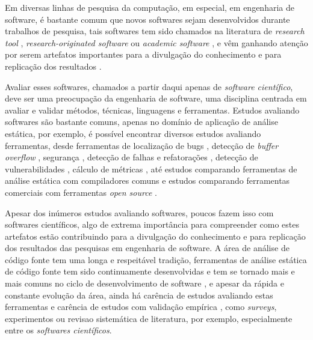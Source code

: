 
Em diversas linhas de pesquisa da computação, em especial, em engenharia de
software, é bastante comum que novos softwares sejam desenvolvidos durante
trabalhos de pesquisa, tais softwares tem sido chamados na literatura de {\it
research tool} \cite{Portillo12}, {\it research-originated software}
\cite{Kon2011} ou {\it academic software}
\cite{allen2017engineering}, e vêm ganhando atenção por serem artefatos importantes para a
divulgação do conhecimento e para replicação dos resultados \cite{Stodden2009}.

Avaliar esses softwares, chamados a partir daqui apenas de {\it software
científico}, deve ser uma preocupação da engenharia de software, uma disciplina
centrada em avaliar e validar métodos, técnicas, linguagens e ferramentas.
Estudos avaliando softwares são bastante comuns, apenas no domínio
de aplicação de análise estática, por exemplo, é possível encontrar diversos estudos
avaliando ferramentas, desde ferramentas de localização de bugs \cite{Rutar2004}, detecção
de {\it buffer overflow} \cite{Kratkiewicz2005}, segurança \cite{Okun2007,
Johns2011}, detecção de falhas e refatorações \cite{Wedyan2009}, detecção de
vulnerabilidades \cite{Li2010, Ataide2014}, cálculo de métricas
\cite{Alemerien2013}, até estudos comparando ferramentas de análise estática
com compiladores comuns \cite{Emanuelsson2008} e estudos comparando ferramentas
comerciais com ferramentas {\it open source} \cite{Al2010}.


Apesar dos inúmeros estudos avaliando softwares, poucos fazem isso com
softwares científicos, algo de extrema importância para compreender como estes
artefatos estão contribuindo para a divulgação do conhecimento e para
replicação dos resultados das pesquisas em engenharia de software. A área de
análise de código fonte tem uma longa e respeitável tradição, ferramentas de
análise estática de código fonte tem sido continuamente desenvolvidas e tem se
tornado mais e mais comuns no ciclo de desenvolvimento de software
\cite{Novak2010}, e apesar da rápida e constante evolução da área, ainda há
carência de estudos avaliando estas ferramentas \cite{Li2010} e carência
de estudos com validação empírica \cite{ilyas2016static}, como {\it
surveys}, experimentos ou revisao sistemática de literatura, por exemplo, especialmente entre
os {\it softwares científicos}.

